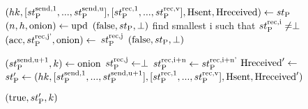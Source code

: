 \algrenewcommand\textproc{}
\algrenewcommand{}

\begin{minipage}{\linewidth}
  {\fontsize{8}{10}\selectfont
  \begin{algorithmic}[1]
    \State $(hk, [st_\text{P}^\text{send,1},...,st_\text{P}^\text{send,u}],
                 [st_\text{P}^\text{rec,1},...,st_\text{P}^\text{rec,v}],
    \text{Hsent}, \text{Hreceived}) \gets st_\text{P}$
    \State $(n,h,\text{onion}) \gets \text{upd}$
    \State \Return $(\text{false},st_\text{P},\perp)$
    \EndIf
    \State find smallest i such that $st_\text{P}^\text{rec,i} \neq \perp$
    \State $(\text{acc},st_\text{P}^\text{rec,j'},\text{onion}) \gets$ 
    {$st_\text{P}^\text{rec,j}$}
    \State \Return $(\text{false},st_\text{P},\perp)$
    \EndIf
    \EndFor

    \State $(st_\text{P}^\text{send,u+1},k) \gets \text{onion}$
    \State $st_\text{P}^\text{rec,j} \gets \perp$
    \EndFor
    \State $st_\text{P}^\text{rec,i+n} \gets st_\text{P}^\text{rec,i+n'}$
    \State $\text{Hreceived}' \gets$ 
    \State $st_\text{P}' \gets (hk,[st_\text{P}^\text{send,1},...,st_\text{P}^\text{send,u+1}],
                 [st_\text{P}^\text{rec,1},...,st_\text{P}^\text{rec,v}], \text{Hsent}, \text{Hreceived}')$

    \State \Return $(\text{true}, st_\text{P}',k)$
    \EndProcedure
  \end{algorithmic}
  }
\end{minipage}
